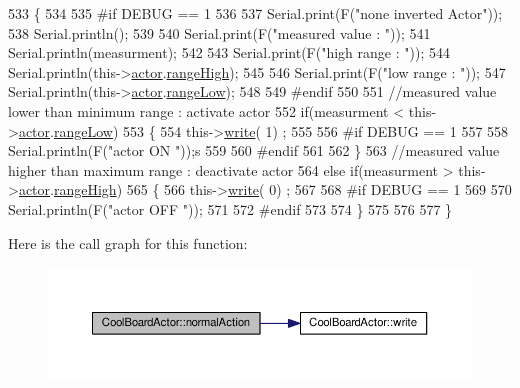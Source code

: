 \begin{DoxyCode}
533 \{
534 
535 \textcolor{preprocessor}{#if DEBUG == 1}
536     
537     Serial.print(F(\textcolor{stringliteral}{"none inverted Actor"}));
538     Serial.println();
539 
540     Serial.print(F(\textcolor{stringliteral}{"measured value : "}));
541     Serial.println(measurment);
542 
543     Serial.print(F(\textcolor{stringliteral}{"high range : "}));
544     Serial.println(this->\hyperlink{class_cool_board_actor_a8f190db9f7a39fddbcef7f152da970e9}{actor}.\hyperlink{struct_cool_board_actor_1_1state_a6e5cd6c5cd44e2decfd8d4df1853f8e3}{rangeHigh});
545 
546     Serial.print(F(\textcolor{stringliteral}{"low range : "}));
547     Serial.println(this->\hyperlink{class_cool_board_actor_a8f190db9f7a39fddbcef7f152da970e9}{actor}.\hyperlink{struct_cool_board_actor_1_1state_a43f891c9fb3bb63575c27cec860de55a}{rangeLow});
548 
549 \textcolor{preprocessor}{#endif}
550 
551     \textcolor{comment}{//measured value lower than minimum range : activate actor}
552     \textcolor{keywordflow}{if}(measurment < this->\hyperlink{class_cool_board_actor_a8f190db9f7a39fddbcef7f152da970e9}{actor}.\hyperlink{struct_cool_board_actor_1_1state_a43f891c9fb3bb63575c27cec860de55a}{rangeLow})
553     \{
554         this->\hyperlink{class_cool_board_actor_a958786ff01ea1056ee72c72d439f86da}{write}( 1) ;
555 
556 \textcolor{preprocessor}{    #if DEBUG == 1 }
557 
558         Serial.println(F(\textcolor{stringliteral}{"actor ON "}));s
559     
560 \textcolor{preprocessor}{    #endif}
561                 
562     \}
563     \textcolor{comment}{//measured value higher than maximum range : deactivate actor}
564     \textcolor{keywordflow}{else} \textcolor{keywordflow}{if}(measurment > this->\hyperlink{class_cool_board_actor_a8f190db9f7a39fddbcef7f152da970e9}{actor}.\hyperlink{struct_cool_board_actor_1_1state_a6e5cd6c5cd44e2decfd8d4df1853f8e3}{rangeHigh})
565     \{
566         this->\hyperlink{class_cool_board_actor_a958786ff01ea1056ee72c72d439f86da}{write}( 0) ;
567 
568 \textcolor{preprocessor}{    #if DEBUG == 1 }
569 
570         Serial.println(F(\textcolor{stringliteral}{"actor OFF "}));
571     
572 \textcolor{preprocessor}{    #endif}
573     
574     \}
575 
576 
577 \}
\end{DoxyCode}
Here is the call graph for this function\+:\nopagebreak
\begin{figure}[H]
\begin{center}
\leavevmode
\includegraphics[width=350pt]{dc/d69/class_cool_board_actor_a81229abf5895f4d3b0355050b822b438_cgraph}
\end{center}
\end{figure}
